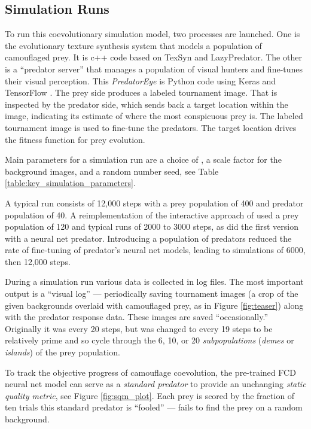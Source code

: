 \documentclass[letterpaper]{article}
\newcommand{\jargon}[1]{\textit{#1}}
\newcommand{\texsyn}[0]{TexSyn}
\newcommand{\lazypredator}[0]{LazyPredator}
\newcommand{\predatoreye}[0]{PredatorEye}
\begin{document}
\subsection{Simulation Runs}
\label{subsec:simulation_runs}
To run this coevolutionary simulation model, two processes are launched. One is the evolutionary texture synthesis system that models a population of camouflaged prey. It is c++ code based on \texsyn{} and \lazypredator{}. The other is a “predator server” that manages a population of visual hunters and fine-tunes their visual perception. This \jargon{\predatoreye{}} \citep{reynolds_predatoreye_2021} is Python code using Keras \citep{chollet_keras_2015} and TensorFlow \citep{tensorflow_whitepaper_2015}. The prey side produces a labeled tournament image. That is inspected by the predator side, which sends back a target location within the image, indicating its estimate of where the most conspicuous prey is. The labeled tournament image is used to fine-tune the predators. The target location drives the fitness function for prey evolution.
\par
Main parameters for a simulation run are a choice of , a scale factor for the background images, and a random number seed, see Table \ref{table:key_simulation_parameters}.
\par
A typical run consists of 12,000 steps with a prey population of 400 and predator population of 40. A reimplementation of the interactive approach of \citet{reynolds_iec_2011} used a prey population of 120 and typical runs of 2000 to 3000 steps, as did the first version with a neural net predator. Introducing a population of predators reduced the rate of fine-tuning of predator's neural net models, leading to simulations of 6000, then 12,000 steps.
\par
During a simulation run various data is collected in log files. The most important output is a “visual log” — periodically saving tournament images (a crop of the given backgrounds overlaid with camouflaged prey, as in Figure \ref{fig:teaser}) along with the predator response data. These images are saved “occasionally.” Originally it was every 20 steps, but was changed to every 19 steps to be relatively prime and so cycle through the 6, 10, or 20 \jargon{subpopulations} (\jargon{demes} or \jargon{islands}) of the prey population.
\par
To track the objective progress of camouflage coevolution, the pre-trained FCD neural net model can serve as a \jargon{standard predator} to provide an unchanging \jargon{static quality metric}, see Figure \ref{fig:sqm_plot}. Each prey is scored by the fraction of ten trials this standard predator is “fooled” — fails to find the prey on a random background.
\par
\end{document}
